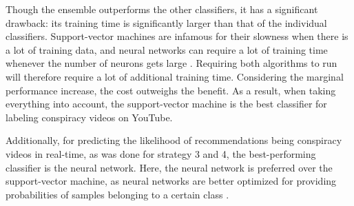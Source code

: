 \documentclass[../main.tex]{subfiles}
\begin{document}
Though the ensemble outperforms the other classifiers, it has a significant drawback: its training time
is significantly larger than that of the individual classifiers. Support-vector machines are infamous
for their slowness when there is a lot of training data, and neural networks can require a lot of
training time whenever the number of neurons gets large \citep{burges1997improving,
kamarthi1999accelerating}. Requiring both algorithms to run will therefore require a lot of additional
training time. Considering the marginal performance increase, the cost outweighs the benefit. As a
result, when taking everything into account, the support-vector machine is the best classifier for
labeling conspiracy videos on YouTube.

Additionally, for predicting the likelihood of recommendations being conspiracy videos in real-time, as was 
done for strategy 3 and 4, the best-performing classifier is the neural network. Here, the neural network is
preferred over the support-vector machine, as neural networks are better optimized for providing 
probabilities of samples belonging to a certain class \citep{specht1990probabilistic}.
\end{document}
